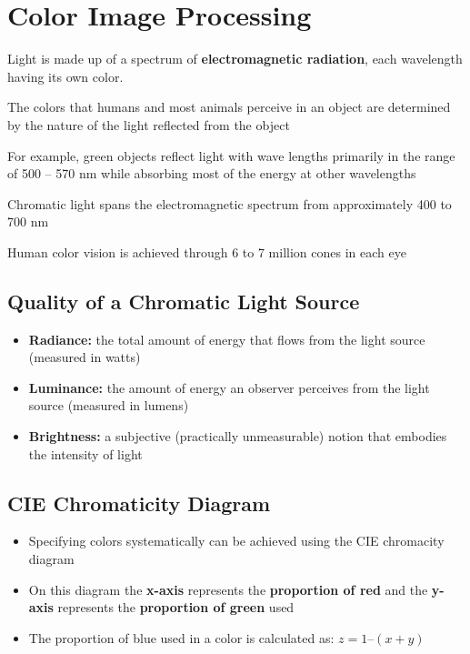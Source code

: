 \section*{Color Image Processing}

Light is made up of a spectrum of \textbf{electromagnetic radiation},
each wavelength having its own color.

The colors that humans and most animals perceive in an object are
determined by the nature of the light reflected from the object

For example, green objects reflect light with wave lengths primarily
in the range of 500 – 570 nm while absorbing most of the energy at
other wavelengths

Chromatic light spans the electromagnetic spectrum from approximately
400 to 700 nm

Human color vision is achieved through 6 to 7 million cones in each eye

\subsection*{Quality of a Chromatic Light Source}

\begin{itemize}
  \item \textbf{Radiance:} the total amount of energy that flows from
    the light source (measured in watts)
  \item \textbf{Luminance:} the amount of energy an observer
    perceives from the light source (measured in lumens)
  \item \textbf{Brightness:} a subjective (practically unmeasurable)
    notion that embodies the intensity of light
\end{itemize}

\subsection*{CIE Chromaticity Diagram}

\begin{itemize}
  \item Specifying colors systematically can be achieved using the
    CIE chromacity diagram
  \item On this diagram the \textbf{x-axis} represents the
    \textbf{proportion of red} and the \textbf{y-axis} represents the
    \textbf{proportion of green} used
  \item The proportion of blue used in a color is calculated as: $z
    = 1 – (x + y)$
\end{itemize}


